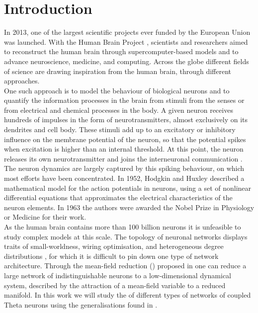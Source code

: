 \newpage
\section{Introduction} \label{sec:Introduction}
In 2013, one of the largest scientific projects ever funded by the European Union was launched. With the Human Brain Project \cite{humanbrainproject}, scientists and researchers aimed to reconstruct the human brain through supercomputer-based models and to advance neuroscience, medicine, and computing. Across the globe different fields of science are drawing inspiration from the human brain, through different approaches. \\
One such approach is to model the behaviour of biological neurons and to quantify the information processes in the brain from stimuli from the senses or from electrical and chemical processes in the body. A given neuron receives hundreds of impulses in the form of neurotransmitters, almost exclusively on its dendrites and cell body. These stimuli add up to an excitatory or inhibitory influence on the membrane potential of the neuron, so that the potential spikes when excitation is higher than an internal threshold. At this point, the neuron releases its own neurotransmitter and joins the interneuronal communication \cite{IntroductionModelingDynamics}. The neuron dynamics are largely captured by this spiking behaviour, on which most efforts have been concentrated.
In 1952, Hodgkin and Huxley described a mathematical model for the action potentials in neurons, using a set of nonlinear differential equations that approximates the electrical characteristics of the neuron elements. In 1963 the authors were awarded the Nobel Prize in Physiology or Medicine \cite{nobel1963} for their work.\\

As the human brain contains more than 100 billion neurons \cite{Herculano2009} it is unfeasible to study complex models at this scale. The topology of neuronal networks displays traits of small-worldness, wiring optimisation, and heterogeneous degree distributions \cite{Bullmore2010}, for which it is difficult to pin down one type of network architecture. Through the mean-field reduction (\MFR) proposed in \cite{OttAntonsen2008} one can reduce a large network of indistinguishable neurons to a low-dimensional dynamical system, described by the attraction of a mean-field variable to a reduced manifold.
In this work we will study the \MFR of different types of networks of coupled Theta neurons using the generalisations found in \cite{OttAntonsen2017}. \\


